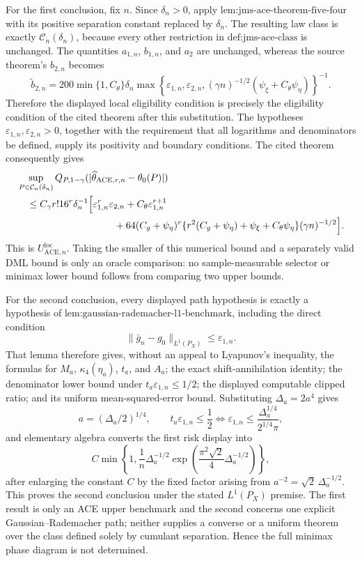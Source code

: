 For the first conclusion, fix \(n\).  Since \(\delta_n>0\), apply \(\text{lem:jms-ace-theorem-five-four}\) with its positive separation constant replaced by \(\delta_n\).  The resulting law class is exactly \(\mathcal C_n(\delta_n)\), because every other restriction in \(\text{def:jms-ace-class}\) is unchanged.  The quantities \(a_{1,n}\), \(b_{1,n}\), and \(a_2\) are unchanged, whereas the source theorem's \(b_{2,n}\) becomes
\[
 \widetilde b_{2,n}
 =200\min\{1,C_{\theta}\}\delta_n
 \max\!\left\{\varepsilon_{1,n},\varepsilon_{2,n},
 (\gamma n)^{-1/2}(\psi_{\xi}+C_{\theta}\psi_{\eta})\right\}^{-1}.
\]
Therefore the displayed local eligibility condition is precisely the eligibility condition of the cited theorem after this substitution.  The hypotheses \(\varepsilon_{1,n},\varepsilon_{2,n}>0\), together with the requirement that all logarithms and denominators be defined, supply its positivity and boundary conditions.  The cited theorem consequently gives
\[
\begin{aligned}
 &\sup_{P\in\mathcal C_n(\delta_n)}
 Q_{P,1-\gamma}(|\widehat\theta_{\mathrm{ACE},r,n}-\theta_0(P)|)\\
 &\quad\le C_{\gamma}r!16^r\delta_n^{-1}
 \Bigl[\varepsilon_{1,n}^r\varepsilon_{2,n}
 +C_{\theta}\varepsilon_{1,n}^{r+1}\\
 &\hspace{35mm}+64(C_g+\psi_{\eta})^r
 \{r^2(C_g+\psi_{\eta})+\psi_{\xi}+C_{\theta}\psi_{\eta}\}
 (\gamma n)^{-1/2}\Bigr].
\end{aligned}
\]
This is \(U_{\mathrm{ACE},n}^{\mathrm{loc}}\).  Taking the smaller of this numerical bound and a separately valid DML bound is only an oracle comparison: no sample-measurable selector or minimax lower bound follows from comparing two upper bounds.

For the second conclusion, every displayed path hypothesis is exactly a hypothesis of \(\text{lem:gaussian-rademacher-l1-benchmark}\), including the direct condition
\[
 \lVert\bar g_n-g_0\rVert_{L^1(P_X)}\le\varepsilon_{1,n}.
\]
That lemma therefore gives, without an appeal to Lyapunov's inequality, the formulas for \(M_a\), \(\kappa_4(\eta_a)\), \(t_a\), and \(A_a\); the exact shift-annihilation identity; the denominator lower bound under \(t_a\varepsilon_{1,n}\le1/2\); the displayed computable clipped ratio; and its uniform mean-squared-error bound.  Substituting \(\Delta_a=2a^4\) gives
\[
 a=(\Delta_a/2)^{1/4},
 \qquad
 t_a\varepsilon_{1,n}\le\frac12
 \iff
 \varepsilon_{1,n}\le\frac{\Delta_a^{1/4}}{2^{1/4}\pi},
\]
and elementary algebra converts the first risk display into
\[
 C\min\!\left\{1,\frac1n\Delta_a^{-1/2}
 \exp\!\left(\frac{\pi^2\sqrt2}{4}\Delta_a^{-1/2}\right)\right\},
\]
after enlarging the constant \(C\) by the fixed factor arising from \(a^{-2}=\sqrt2\,\Delta_a^{-1/2}\).  This proves the second conclusion under the stated \(L^1(P_X)\) premise.  The first result is only an ACE upper benchmark and the second concerns one explicit Gaussian--Rademacher path; neither supplies a converse or a uniform theorem over the class defined solely by cumulant separation.  Hence the full minimax phase diagram is not determined.